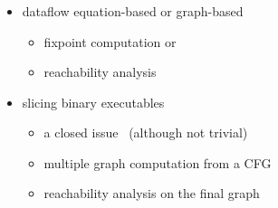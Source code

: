 \documentclass{beamer}
\begin{document}
  \begin{frame}
    \frametitle{\secname}
    \framesubtitle{\subsecname}
    
    \begin{itemize}
      \item dataflow equation-based or graph-based
        \begin{itemize}
          \item fixpoint computation or
          \item reachability analysis
        \end{itemize}
        
      \vspace{1em}
      \item slicing binary executables
      \begin{itemize}
        \item a closed issue~\cite{KJL03} (although not trivial)
        \item multiple graph computation from a CFG
        \item reachability analysis on the final graph
      \end{itemize}
      
    \end{itemize}
  \end{frame}
  
\end{document}
